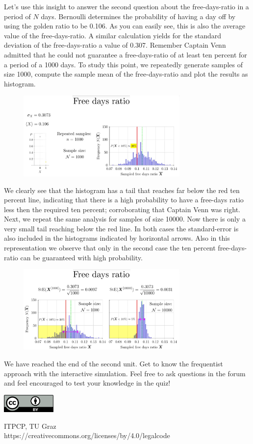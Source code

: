 \documentclass[12pt, a4paper]{scrartcl}
\begin{document}
Let's use this insight to answer the second question about the free-days-ratio in a period of $N$ days.
Bernoulli determines the probability of having a day off by using the golden ratio to be 0.106. 
As you can easily see, this is also the average value of the free-days-ratio.
A similar calculation yields for the standard deviation of the free-days-ratio a value of 0.307.
Remember Captain Venn admitted that he could not guarantee a free-days-ratio of at least ten percent for a period of a 1000 days.
To study this point, we repeatedly generate samples of size 1000, compute the sample mean of the free-days-ratio and plot the results as histogram.\begin{figure}[H]
	\centering
	\includegraphics[width=0.75\textwidth]{2_12.png}
\end{figure}
We clearly see that the histogram has a tail that reaches far below the red ten percent line, indicating that there is a high probability to have a free-days ratio less then the required ten percent; corroborating that Captain Venn was right.
Next, we repeat the same analysis for samples of size 10000. Now there is only a very small tail reaching below the red line.
In both cases the standard-error is also included in the histograms indicated by horizontal arrows. Also in this representation we observe that only in the second case the ten percent free-days-ratio can be guaranteed with high probability.\\
\begin{figure}[H]
	\centering
	\includegraphics[width=0.75\textwidth]{2_13.png}
\end{figure}
We have reached the end of the second unit. 
Get to know the frequentist approach with the interactive simulation.
Feel free to ask questions in the forum and feel encouraged to test your knowledge in the quiz!


\vspace{2cm}
\begin{minipage}[t]{1\textwidth}
	\raggedleft
	\centering
	\includegraphics[width = 0.20\textwidth]{CC-BY_icon}
	\vspace{0.2cm}
	
	\centering
	{\large ITPCP, TU Graz} \\
	https://creativecommons.org/licenses/by/4.0/legalcode
\end{minipage}
\end{document}
